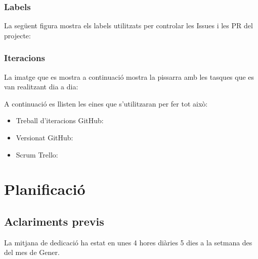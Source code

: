 \documentclass[letterpaper,11pt,catalan]{sphinxmanual}
\begin{document}
\subsection{Labels}
\label{\detokenize{index:labels}}
La següent figura mostra els labels utilitzats per controlar les Issues i les PR del
projecte:


\begin{DUlineblock}{0em}
\item[] 
\end{DUlineblock}


\subsection{Iteracions}
\label{\detokenize{index:iteracions}}
La imatge que es mostra a continuació mostra la pissarra amb les tasques que es van realitzant dia
a dia:


\begin{DUlineblock}{0em}
\item[] 
\item[] 
\end{DUlineblock}

A continuació es llisten les eines que s'utilitzaran per fer tot això:
\begin{itemize}
\item {} 
Treball d'iteracions
GitHub: 

\item {} 
Versionat
GitHub: 

\item {} 
Scrum
Trello: 

\end{itemize}


\chapter{Planificació}
\label{\detokenize{index:planificacio}}

\section{Aclariments previs}
\label{\detokenize{index:aclariments-previs}}
La mitjana de dedicació ha estat en unes 4 hores diàries 5 dies a la setmana des del mes
de Gener.
\end{document}
